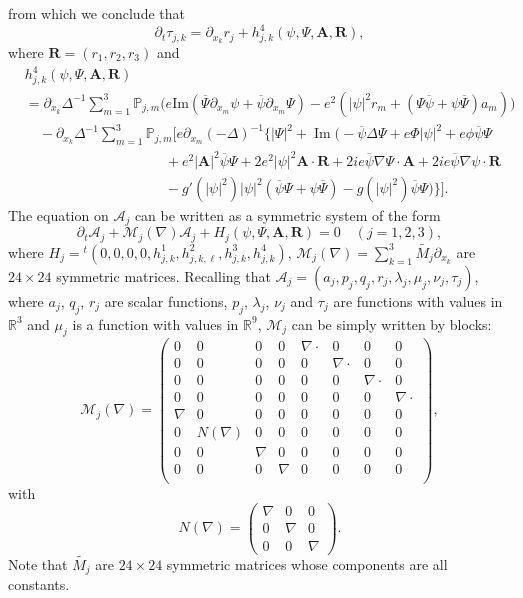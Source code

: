 \documentclass[10pt]{amsart}
\theoremstyle{definition}\newtheorem{defi}[theo]{Definition}\newtheorem{rema}[theo]{Remark}\newtheorem{exam}[theo]{Example}\newtheorem{exem}[theo]{Example}\newtheorem{nota}[theo]{Notation}
\newcommand{\BA}{\mathbf{A}}
\newcommand{\BR}{\mathbf{R}}
\newcommand{\R}{\mathbb{R}}
\DeclareMathOperator{\IM}{Im}
\begin{document}
from which we conclude that
\[
\partial_t \tau_{j,k}
= \partial_{x_k} r_j + h_{j,k}^4(\psi,\Psi,\BA, \BR),
\]
where $\BR=(r_1,r_2,r_3)$ and
\begin{align*}
&h^4_{j,k}(\psi,\Psi,\BA, \BR) \\
&=\partial_{x_k} \Delta^{-1}\sum_{m=1}^3 {\mathbb P}_{j,m}\Big(e\text{Im}(\overline{\Psi}\partial_{x_m}\psi + \overline{\psi}\partial_{x_m} \Psi) -e^2(|\psi|^2 r_m+(\Psi \overline{\psi}+\psi \overline{\Psi}) a_m)\Big) \\
&\quad -\partial_{x_k} \Delta^{-1}\sum_{m=1}^3 {\mathbb P}_{j,m} \Big[e \partial_{x_m} (-\Delta)^{-1} \Big\{ |\Psi|^2 + \IM \Big(-\overline{\psi} \Delta \Psi +e \Phi |\psi|^2 +e \phi \overline{\psi} \Psi \\
&\hspace{10em} +e^2 |\BA|^2 \overline{\psi} \Psi+ 2e^2 |\psi|^2 \BA \cdot \BR +2i e \overline{\psi} \nabla \Psi \cdot \BA +2i e \overline{\psi} \nabla \psi \cdot \BR \\
&\hspace{10em} -g'(|\psi|^2)|\psi|^2(\overline{\psi}\Psi+\psi\overline{\Psi}) - g(|\psi|^2) \overline{\psi} \Psi \Big) \Big\} \Big].
\end{align*}
The equation on $\mathcal{A}_j$ can be written as a symmetric system of the form
\[
\partial_t \mathcal{A}_j+\mathcal{M}_j(\nabla)\mathcal{A}_j +H_j(\psi,\Psi,\BA,\BR)=0 \quad (j=1,2,3),
\]
where $H_j={}^t (0,0,0,0,h_{j,k}^1, h_{j,k,\ell}^2, h_{j,k}^3, h_{j,k}^4)$, $\mathcal{M}_j(\nabla)= \sum_{k=1}^3 \widetilde{M_j} \partial_{x_k}$ are $24 \times 24$ symmetric matrices. Recalling that $\mathcal{A}_j=(a_j,p_j,q_j,r_j,\lambda_j,\mu_j,\nu_j,\tau_j)$, where $a_j$, $q_j$, $r_j$ are scalar functions, $p_j$, $\lambda_j$, $\nu_j$ and $\tau_j$ are functions with values in $\R^3$ and $\mu_j$ is a function with values in $\R^9$, $\mathcal{M}_j$ can be simply written by blocks:
\[
\mathcal{M}_j(\nabla)=
\left(
\begin{array}{cccccccc}
0&0&0&0&\nabla \cdot&0&0&0\\
0&0&0&0&0&\nabla \cdot&0&0\\
0&0&0&0&0&0&\nabla \cdot&0\\
0&0&0&0&0&0&0&\nabla \cdot \\
\nabla&0&0&0&0&0&0&0\\
0&N(\nabla)&0&0&0&0&0&0\\
0&0&\nabla&0&0&0&0&0\\
0&0&0&\nabla&0&0&0&0\\
\end{array}
\right),
\]
with
\[
N(\nabla)=
\left(
\begin{array}{ccc}
\nabla&0&0\\
0&\nabla&0\\
0&0&\nabla
\end{array}
\right).
\]
Note that $\widetilde{M_j}$ are $24 \times 24$ symmetric matrices whose components are all constants.
\end{document}

